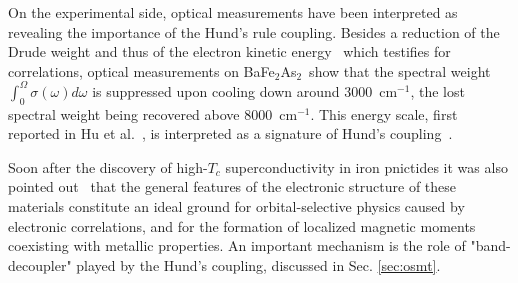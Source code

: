 \documentclass[]{ar2e-changed}%
\def\BFA{BaFe$_2$As$_2$}
\begin{document}
% 
%
On the experimental side, optical measurements have been interpreted as revealing the importance of the 
Hund's rule coupling. 
%
Besides a reduction of the Drude weight and thus of the electron kinetic energy~\cite{Qazilbash_correlations_pnictides} which testifies 
for correlations, optical measurements on \BFA\, show that 
the spectral weight $\int_0^\Omega \sigma(\omega) d \omega$ is suppressed upon cooling
down around $3000$~cm$^{-1}$, the lost spectral weight being recovered above
$8000$~cm$^{-1}$. This energy scale, first reported in Hu et al.~\cite{Hu_Optics_SDW_origin}, is interpreted as a signature of Hund's coupling~\cite{Wang_pseudogap_optics,Schafgans_optics_Co122_correlations_Hund}.

%
Soon after the discovery of high-$T_c$ superconductivity in iron pnictides it was also pointed
out~\cite{demedici_3bandOSMT,demedici_Genesis} that the general
features of the electronic structure of these materials constitute an
ideal ground for orbital-selective physics caused by electronic
correlations, and for the formation of localized magnetic moments
coexisting with metallic properties.  
%
An important mechanism is the role of "band-decoupler" played by the Hund's coupling, discussed in
Sec. \ref{sec:osmt}.
\end{document}
